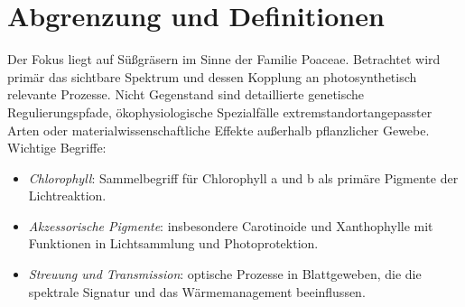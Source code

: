 \section{Abgrenzung und Definitionen}
Der Fokus liegt auf Süßgräsern im Sinne der Familie Poaceae. Betrachtet wird primär das sichtbare Spektrum und dessen Kopplung an photosynthetisch relevante Prozesse. Nicht Gegenstand sind detaillierte genetische Regulierungspfade, ökophysiologische Spezialfälle extremstandortangepasster Arten oder materialwissenschaftliche Effekte außerhalb pflanzlicher Gewebe. Wichtige Begriffe:
\begin{itemize}
  \item \textit{Chlorophyll}: Sammelbegriff für Chlorophyll a und b als primäre Pigmente der Lichtreaktion.
  \item \textit{Akzessorische Pigmente}: insbesondere Carotinoide und Xanthophylle mit Funktionen in Lichtsammlung und Photoprotektion.
  \item \textit{Streuung und Transmission}: optische Prozesse in Blattgeweben, die die spektrale Signatur und das Wärmemanagement beeinflussen.
\end{itemize}

